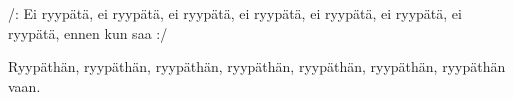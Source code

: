 	
\beginverse*						
/: Ei ryypätä, ei ryypätä, ei ryypätä, ei ryypätä,
ei ryypätä, ei ryypätä, ei ryypätä, 
ennen kun saa :/
\endverse						

\beginverse				
Ryypäthän, ryypäthän, ryypäthän, ryypäthän,
ryypäthän, ryypäthän, 
ryypäthän vaan.
\endverse		
\endsong		

